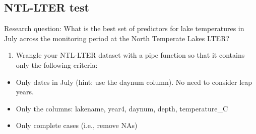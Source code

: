 \documentclass[
]{article}
\newenvironment{Shaded}{\begin{snugshade}}{\end{snugshade}}
\newcommand{\CommentTok}[1]{\textcolor[rgb]{0.56,0.35,0.01}{\textit{#1}}}
\newcommand{\DataTypeTok}[1]{\textcolor[rgb]{0.13,0.29,0.53}{#1}}
\newcommand{\DecValTok}[1]{\textcolor[rgb]{0.00,0.00,0.81}{#1}}
\newcommand{\KeywordTok}[1]{\textcolor[rgb]{0.13,0.29,0.53}{\textbf{#1}}}
\newcommand{\NormalTok}[1]{#1}
\newcommand{\OperatorTok}[1]{\textcolor[rgb]{0.81,0.36,0.00}{\textbf{#1}}}
\newcommand{\StringTok}[1]{\textcolor[rgb]{0.31,0.60,0.02}{#1}}
\providecommand{\tightlist}{%
  \setlength{\itemsep}{0pt}\setlength{\parskip}{0pt}}
\begin{document}
\begin{Shaded}
\end{Shaded}

\hypertarget{ntl-lter-test}{%
\subsection{NTL-LTER test}\label{ntl-lter-test}}

Research question: What is the best set of predictors for lake
temperatures in July across the monitoring period at the North Temperate
Lakes LTER?

\begin{enumerate}
\def\labelenumi{\arabic{enumi}.}
\setcounter{enumi}{2}
\tightlist
\item
  Wrangle your NTL-LTER dataset with a pipe function so that it contains
  only the following criteria:
\end{enumerate}

\begin{itemize}
\tightlist
\item
  Only dates in July (hint: use the daynum column). No need to consider
  leap years.
\item
  Only the columns: lakename, year4, daynum, depth, temperature\_C
\item
  Only complete cases (i.e., remove NAs)
\end{itemize}
\end{document}
